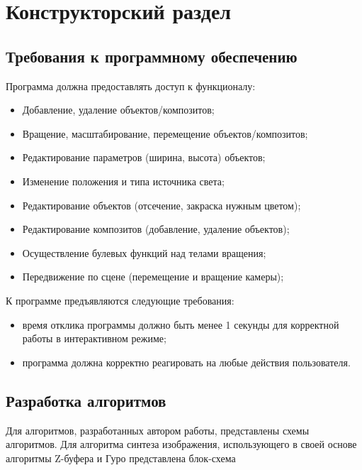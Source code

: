 \chapter{Конструкторский раздел}
\section{Требования к программному обеспечению}
Программа должна предоставлять доступ к функционалу:
\begin{itemize}
    \item Добавление, удаление объектов/композитов;
    \item Вращение, масштабирование, перемещение объектов/композитов;
    \item Редактирование параметров (ширина, высота) объектов;
    \item Изменение положения и типа источника света;
    \item Редактирование объектов (отсечение, закраска нужным цветом);
    \item Редактирование композитов (добавление, удаление объектов);
    \item Осуществление булевых функций над телами вращения;
    \item Передвижение по сцене (перемещение и вращение камеры);
\end{itemize}

К программе предъявляются следующие требования:

\begin{itemize}
    \item время отклика программы должно быть менее 1 секунды для корректной работы в интерактивном режиме;
    \item программа должна корректно реагировать на любые действия пользователя.
\end{itemize}

\section{Разработка алгоритмов}
Для алгоритмов, разработанных автором работы, представлены схемы
алгоритмов. Для алгоритма синтеза изображения, использующего в своей
основе алгоритмы Z-буфера и Гуро представлена блок-схема


